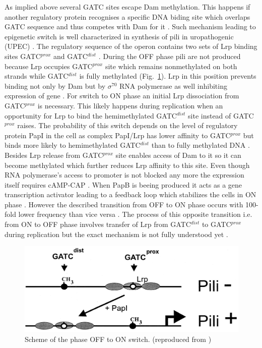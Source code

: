 As implied above several GATC sites escape Dam methylation.
This happens if another regulatory protein recognises a specific DNA biding site which overlaps GATC sequence and thus competes with Dam for it \cite{correnti2002dam}.
Such mechanism leading to epigenetic switch is well characterized in synthesis of  pili in uropathogenic  (UPEC) \cite{peterson2008competitive}.
The regulatory sequence of the  operon contains two sets of Lrp binding sites GATC$^{prox}$ and GATC$^{dist}$ \cite{blyn1990regulation}.
During the OFF phase  pili are not produced because Lrp occupies GATC$^{prox}$ site which remains nonmethylated on both strands while GATC$^{dist}$ is fully methylated (Fig.~\ref{pap}).
Lrp in this position prevents binding not only by Dam but by $\sigma^{70}$ RNA polymerase as well inhibiting expression of  gene \cite{weyand2000regulation}.
For switch to ON phase an initial Lrp dissociation from GATC$^{prox}$ is necessary.
This likely happens during replication when an opportunity for Lrp to bind the hemimethylated GATC$^{dist}$ site instead of GATC$^{prox}$ raises.
The probability of this switch depends on the level of regulatory protein PapI in the cell as complex PapI/Lrp has lower affinity to GATC$^{prox}$ but binds more likely to hemimethylated GATC$^{dist}$ than to fully methylated DNA \cite{hernday2003mechanism}.
Besides Lrp release from GATC$^{prox}$ site enables access of Dam to it so it can become methylated which further reduces Lrp affinity to this site.
Even though RNA polymerase's access to  promoter is not blocked any more the expression itself requires cAMP-CAP \cite{weyand2001essential}.
When PapB is beeing produced it acts as a  gene transcription activator leading to a feedback loop which stabilizes the cells in ON phase \cite{forsman1989autoregulation}.
However the described transition from OFF to ON phase occurs with 100-fold lower frequency than vice versa \cite{blyn1990regulation}.
The process of this opposite transition i.e. from ON to OFF phase involves transfer of Lrp from GATC$^{dist}$ to GATC$^{prox}$ during replication but the exact mechanism is not fully understood yet \cite{adhikari2016dna}.

\begin{figure}[h!]
  \centering
  \includegraphics[scale=0.3]{text/Pictures/papPili.png}
	\caption{Scheme of the  phase OFF to ON switch. (reproduced from \cite{low2001roles})}
	\label{pap}
\end{figure}

